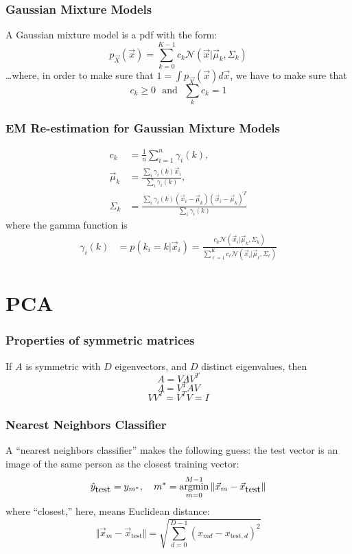 \documentclass{beamer}
\newcommand{\argmin}{\operatornamewithlimits{argmin}}
\begin{document}
\begin{frame}
  \frametitle{Gaussian Mixture Models}

  A Gaussian mixture model is a pdf with the form:
  \[
  p_{\vec{X}}(\vec{x}) = \sum_{k=0}^{K-1}c_{k}{\mathcal N}(\vec{x}|\vec\mu_{k},\Sigma_{k})
  \]
  \ldots where, in order to make sure that $1=\int
  p_{\vec{X}}(\vec{x})d\vec{x}$, we have to make sure that
  \[
  c_{k}\ge 0~~~\mbox{and}~~~\sum_k c_{k}=1
  \]
\end{frame}

\begin{frame}
  \frametitle{EM Re-estimation for Gaussian Mixture Models}

  \begin{align*}
    c_{k} &= \frac{1}{n}\sum_{i=1}^n\gamma_i(k),\\
    \vec\mu_{k} &=\frac{\sum_{i}\gamma_i(k)\vec{x}_i}{\sum_i\gamma_i(k)},\\
    \Sigma_{k} &=
    \frac{\sum_{i}\gamma_i(k)(\vec{x}_i-\vec\mu_{k})(\vec{x}_i-\vec\mu_{k})^T}{\sum_i\gamma_i(k)}
  \end{align*}
  where the gamma function is
  \begin{align*}
    \gamma_i(k) &=
    p(k_i=k|\vec{x}_i) =
    \frac{c_{k}{\mathcal N}(\vec{x}_i|\vec\mu_{k},\Sigma_{k})}{\sum_{\ell=1}^K c_{\ell}{\mathcal N}(\vec{x}_i|\vec\mu_{\ell},\Sigma_{\ell})}
  \end{align*}
\end{frame}

\section[PCA]{PCA}
\setcounter{subsection}{1}

\begin{frame}
  \frametitle{Properties of symmetric matrices}
  If $A$ is symmetric with $D$ eigenvectors, and $D$ distinct eigenvalues, then
  \[
  A=V\Lambda V^T
  \]
  \[
  \Lambda = V^TAV
  \]
  \[
  VV^T=V^TV=I
  \]
\end{frame}

\begin{frame}
  \frametitle{Nearest Neighbors Classifier}

  A ``nearest neighbors classifier'' makes the following
  guess: the test vector is an image of the same person as the
  closest training vector:
  \[
  \hat{y}_{\mbox{test}} = y_{m^*},~~~
  m^*=\argmin_{m=0}^{M-1}\Vert\vec{x}_m-\vec{x}_{\mbox{test}}\Vert
  \]
  where ``closest,'' here, means Euclidean distance:
  \[
  \Vert\vec{x}_m-\vec{x}_{\mbox{test}}\Vert =
  \sqrt{\sum_{d=0}^{D-1} (x_{md}-x_{\mbox{test},d})^2}
  \]
\end{frame}
\end{document}
